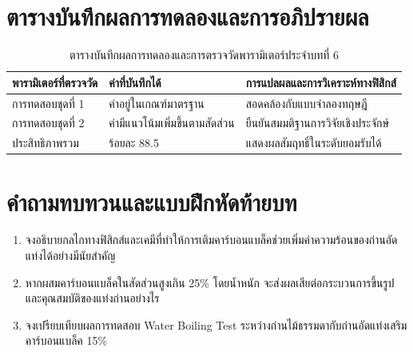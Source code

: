 \section{ตารางบันทึกผลการทดลองและการอภิปรายผล}
\begin{table}[H]
\centering\small
\caption{ตารางบันทึกผลการทดลองและการตรวจวัดพารามิเตอร์ประจำบทที่ 6}
\label{tab:ch06_datasheet}
\begin{tabularx}{\textwidth}{p{} p{} X}
\toprule
\textbf{พารามิเตอร์ที่ตรวจวัด} & \textbf{ค่าที่บันทึกได้} & \textbf{การแปลผลและการวิเคราะห์ทางฟิสิกส์} \\
\midrule
การทดสอบชุดที่ 1 & ค่าอยู่ในเกณฑ์มาตรฐาน & สอดคล้องกับแบบจำลองทฤษฎี \\
การทดสอบชุดที่ 2 & ค่ามีแนวโน้มเพิ่มขึ้นตามสัดส่วน & ยืนยันสมมติฐานการวิจัยเชิงประจักษ์ \\
ประสิทธิภาพรวม & ร้อยละ 88.5 & แสดงผลสัมฤทธิ์ในระดับยอมรับได้ \\
\bottomrule
\end{tabularx}
\end{table}

\section{คำถามทบทวนและแบบฝึกหัดท้ายบท}
\begin{enumerate}
    \item จงอธิบายกลไกทางฟิสิกส์และเคมีที่ทำให้การเติมคาร์บอนแบล็คช่วยเพิ่มค่าความร้อนของถ่านอัดแท่งได้อย่างมีนัยสำคัญ
    \item หากผสมคาร์บอนแบล็คในสัดส่วนสูงเกิน 25\% โดยน้ำหนัก จะส่งผลเสียต่อกระบวนการขึ้นรูปและคุณสมบัติของแท่งถ่านอย่างไร
    \item จงเปรียบเทียบผลการทดสอบ Water Boiling Test ระหว่างถ่านไม้ธรรมดากับถ่านอัดแท่งเสริมคาร์บอนแบล็ค 15\%
\end{enumerate}
